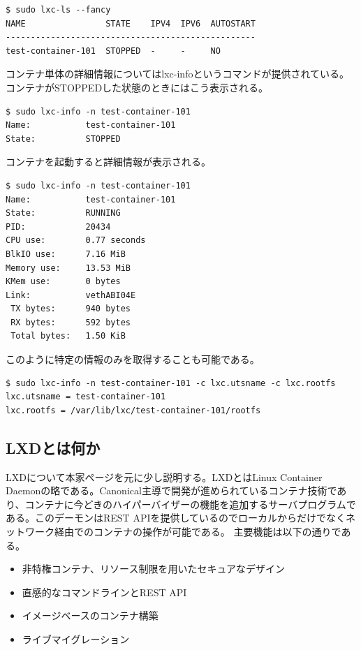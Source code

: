 ﻿\documentclass[9pt,b5paper,tombo,openany]{jsbook}
\begin{document}
\begin{lstlisting}
$ sudo lxc-ls --fancy
NAME                STATE    IPV4  IPV6  AUTOSTART
--------------------------------------------------
test-container-101  STOPPED  -     -     NO
\end{lstlisting}

\noindent
コンテナ単体の詳細情報についてはlxc-infoというコマンドが提供されている。コンテナがSTOPPEDした状態のときにはこう表示される。

\begin{lstlisting}
$ sudo lxc-info -n test-container-101
Name:           test-container-101
State:          STOPPED
\end{lstlisting}

\noindent
コンテナを起動すると詳細情報が表示される。

\begin{lstlisting}
$ sudo lxc-info -n test-container-101
Name:           test-container-101
State:          RUNNING
PID:            20434
CPU use:        0.77 seconds
BlkIO use:      7.16 MiB
Memory use:     13.53 MiB
KMem use:       0 bytes
Link:           vethABI04E
 TX bytes:      940 bytes
 RX bytes:      592 bytes
 Total bytes:   1.50 KiB
\end{lstlisting}


\noindent
このように特定の情報のみを取得することも可能である。

\begin{lstlisting}
$ sudo lxc-info -n test-container-101 -c lxc.utsname -c lxc.rootfs
lxc.utsname = test-container-101
lxc.rootfs = /var/lib/lxc/test-container-101/rootfs
\end{lstlisting}

\newpage

\subsection{LXDとは何か}
LXDについて本家ページを元に少し説明する。LXDとはLinux Container Daemonの略である。Canonical主導で開発が進められているコンテナ技術であり、コンテナに今どきのハイパーバイザーの機能を追加するサーバプログラムである。このデーモンはREST APIを提供しているのでローカルからだけでなくネットワーク経由でのコンテナの操作が可能である。
\noindent
主要機能は以下の通りである。
\begin{itemize}
  \item 非特権コンテナ、リソース制限を用いたセキュアなデザイン
  \item 直感的なコマンドラインとREST API
  \item イメージベースのコンテナ構築
  \item ライブマイグレーション
\end{itemize}
\end{document}
